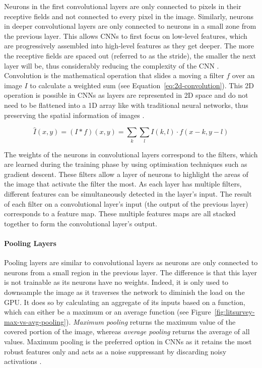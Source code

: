 Neurons in the first convolutional layers are only connected to pixels in their receptive fields and not connected to every pixel in the image. Similarly, neurons in deeper convolutional layers are only connected to neurons in a small zone from the previous layer. This allows CNNs to first focus on low-level features, which are progressively assembled into high-level features as they get deeper. The more the receptive fields are spaced out (referred to as the stride), the smaller the next layer will be, thus considerably reducing the complexity of the CNN \citep{Geron2019}. Convolution is the mathematical operation that slides a moving a filter $f$ over an image $I$ to calculate a weighted sum (see Equation~\ref{eq:2d-convolution}). This 2D operation is possible in CNNs as layers are represented in 2D space and do not need to be flattened into a 1D array like with traditional neural networks, thus preserving the spatial information of images \citep{szeliski2010computer}.

\begin{equation}
\label{eq:2d-convolution}
    \hat{I}(x,y)=(I*f)(x,y)=\sum_{k}\sum_{l}I(k,l)\cdot f(x-k, y-l)
\end{equation}

The weights of the neurons in convolutional layers correspond to the filters, which are learned during the training phase by using optimisation techniques such as gradient descent. These filters allow a layer of neurons to highlight the areas of the image that activate the filter the most. As each layer has multiple filters, different features can be simultaneously detected in the layer's input. The result of each filter on a convolutional layer's input (the output of the previous layer) corresponds to a feature map. These multiple features maps are all stacked together to form the convolutional layer's output.

\paragraph{Pooling Layers}

Pooling layers are similar to convolutional layers as neurons are only connected to neurons from a small region in the previous layer. The difference is that this layer is not trainable as its neurons have no weights. Indeed, it is only used to downsample the image as it traverses the network to diminish the load on the GPU. It does so by calculating an aggregate of its inputs based on a function, which can either be a maximum or an average function (see Figure~\ref{fig:litsurvey-max-vs-avg-pooling}). \textit{Maximum pooling} returns the maximum value of the covered portion of the image, whereas \textit{average pooling} returns the average of all values. Maximum pooling is the preferred option in CNNs as it retains the most robust features only and acts as a noise suppressant by discarding noisy activations \citep{Geron2019}.\\

